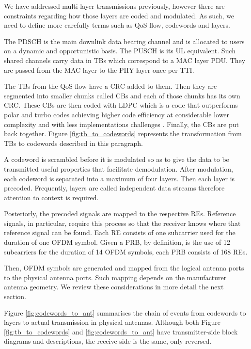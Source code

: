 We have addressed multi-layer transmissions previously, however there are constraints regarding how those layers are coded and modulated. As such, we need to define more carefully terms such as \ac{QoS} flow, codewords and layers.

The \ac{PDSCH} is the main downlink data bearing channel and is allocated to users on a dynamic and opportunistic basis. The \ac{PUSCH} is its \ac{UL} equivalent. Such shared channels carry data in \acp{TB} which correspond to a \ac{MAC} layer \ac{PDU}. They are passed from the \ac{MAC} layer to the \ac{PHY} layer once per \ac{TTI}.

The \acp{TB} from the \ac{QoS} flow have a \ac{CRC} added to them. Then they are segmented into smaller chunks called \acp{CB} and each of those chunks has its own \ac{CRC}. These \acp{CB} are then coded with \ac{LDPC} which is a code that outperforms polar and turbo codes achieving higher code efficiency at considerable lower complexity and with less implementations challenges \cite{qualcomm_innovative_five}. Finally, the \acp{CB} are put back together. Figure \ref{fig:tb_to_codewords} represents the transformation from \acp{TB} to codewords described in this paragraph.


A codeword is scrambled before it is modulated so as to give the data to be transmitted useful properties that facilitate demodulation. After modulation, each codeword is separated into a maximum of four layers. Then each layer is precoded. Frequently, layers are called independent data streams therefore attention to context is required.

Posteriorly, the precoded signals are mapped to the respective \acp{RE}. Reference signals, in particular, require this process so that the receiver knows where that reference signal can be found. Each \ac{RE} consists of one subcarrier used for the duration of one \ac{OFDM} symbol. Given a PRB, by definition, is the use of 12 subcarriers for the duration of 14 OFDM symbols, each PRB consists of 168 \acp{RE}.

Then, \ac{OFDM} symbols are generated and mapped from the logical antenna ports to the physical antenna ports. Such mapping depends on the manufacturer antenna geometry. We review these considerations in more detail the next section.

Figure \ref{fig:codewords_to_ant} summarises the chain of events from codewords to layers to actual transmission in physical antennas. Although both Figure \ref{fig:tb_to_codewords} and \ref{fig:codewords_to_ant} have transmitter-side block diagrams and descriptions, the receive side is the same, only reversed.


